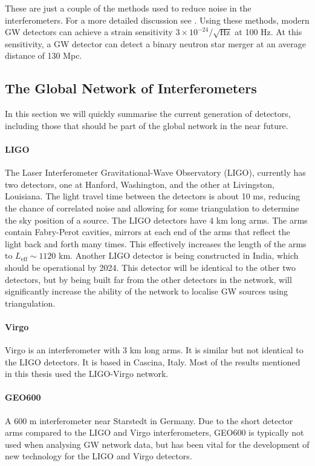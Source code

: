 \documentclass[11pt]{cuthesis}
\begin{document}
These are just a couple of the methods used to reduce noise in the interferometers. For a more detailed discussion see \cite{GW150914-detector,noise_budget_martynov}. Using these methods, modern GW detectors can achieve a strain sensitivity $3\times 10^{-24}/\sqrt{\text{Hz}}$ at 100 Hz. At this sensitivity, a GW detector can detect a binary neutron star merger at an average distance of 130 Mpc. 

\subsection{The Global Network of Interferometers} \label{sec:gw network}
In this section we will quickly summarise the current generation of detectors, including those that should be part of the global network in the near future.
\paragraph{LIGO}
The Laser Interferometer Gravitational-Wave Observatory (LIGO), currently has two detectors, one at Hanford, Washington, and the other at Livingston, Louisiana. The light travel time between the detectors is about 10 ms, reducing the chance of correlated noise and allowing for some triangulation to determine the sky position of a source. The LIGO detectors have 4 km long arms. The arms contain Fabry-Perot cavities, mirrors at each end of the arms that reflect the light back and forth many times. This effectively increases the length of the arms to $L_\text{eff}\sim1120$ km. Another LIGO detector is being constructed in India, which should be operational by 2024. This detector will be identical to the other two detectors, but by being built far from the other detectors in the network, will significantly increase the ability of the network to localise GW sources using triangulation.

\paragraph{Virgo}
Virgo is an interferometer with 3 km long arms. It is similar but not identical to the LIGO detectors. It is based in Cascina, Italy. Most of the results mentioned in this thesis used the LIGO-Virgo network. 

\paragraph{GEO600}
A 600 m interferometer near Starstedt in Germany. Due to the short detector arms compared to the LIGO and Virgo interferometers, GEO600 is typically not used when analysing GW network data, but has been vital for the development of new technology for the LIGO and Virgo detectors. 
\end{document}
